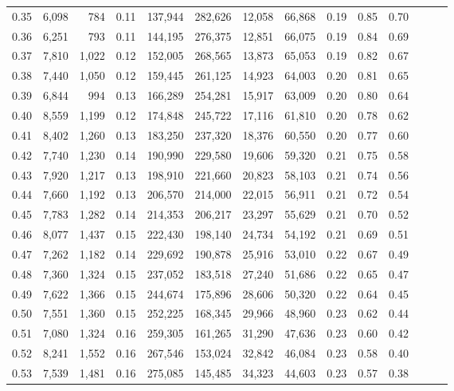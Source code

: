 \begin{tabular}{rrrrrrrrrrrrrr}
0.35 &  6,098 &    784 &  0.11 &  137,944 &  282,626 &  12,058 &  66,868 &  0.19 &  0.85 &      0.70 \\
0.36 &  6,251 &    793 &  0.11 &  144,195 &  276,375 &  12,851 &  66,075 &  0.19 &  0.84 &      0.69 \\
0.37 &  7,810 &  1,022 &  0.12 &  152,005 &  268,565 &  13,873 &  65,053 &  0.19 &  0.82 &      0.67 \\
0.38 &  7,440 &  1,050 &  0.12 &  159,445 &  261,125 &  14,923 &  64,003 &  0.20 &  0.81 &      0.65 \\
0.39 &  6,844 &    994 &  0.13 &  166,289 &  254,281 &  15,917 &  63,009 &  0.20 &  0.80 &      0.64 \\
0.40 &  8,559 &  1,199 &  0.12 &  174,848 &  245,722 &  17,116 &  61,810 &  0.20 &  0.78 &      0.62 \\
0.41 &  8,402 &  1,260 &  0.13 &  183,250 &  237,320 &  18,376 &  60,550 &  0.20 &  0.77 &      0.60 \\
0.42 &  7,740 &  1,230 &  0.14 &  190,990 &  229,580 &  19,606 &  59,320 &  0.21 &  0.75 &      0.58 \\
0.43 &  7,920 &  1,217 &  0.13 &  198,910 &  221,660 &  20,823 &  58,103 &  0.21 &  0.74 &      0.56 \\
0.44 &  7,660 &  1,192 &  0.13 &  206,570 &  214,000 &  22,015 &  56,911 &  0.21 &  0.72 &      0.54 \\
0.45 &  7,783 &  1,282 &  0.14 &  214,353 &  206,217 &  23,297 &  55,629 &  0.21 &  0.70 &      0.52 \\
0.46 &  8,077 &  1,437 &  0.15 &  222,430 &  198,140 &  24,734 &  54,192 &  0.21 &  0.69 &      0.51 \\
0.47 &  7,262 &  1,182 &  0.14 &  229,692 &  190,878 &  25,916 &  53,010 &  0.22 &  0.67 &      0.49 \\
0.48 &  7,360 &  1,324 &  0.15 &  237,052 &  183,518 &  27,240 &  51,686 &  0.22 &  0.65 &      0.47 \\
0.49 &  7,622 &  1,366 &  0.15 &  244,674 &  175,896 &  28,606 &  50,320 &  0.22 &  0.64 &      0.45 \\
0.50 &  7,551 &  1,360 &  0.15 &  252,225 &  168,345 &  29,966 &  48,960 &  0.23 &  0.62 &      0.44 \\
0.51 &  7,080 &  1,324 &  0.16 &  259,305 &  161,265 &  31,290 &  47,636 &  0.23 &  0.60 &      0.42 \\
0.52 &  8,241 &  1,552 &  0.16 &  267,546 &  153,024 &  32,842 &  46,084 &  0.23 &  0.58 &      0.40 \\
0.53 &  7,539 &  1,481 &  0.16 &  275,085 &  145,485 &  34,323 &  44,603 &  0.23 &  0.57 &      0.38 \\

\end{tabular}
